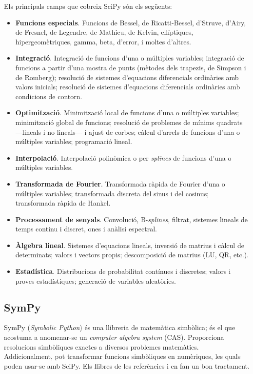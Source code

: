 Els principals camps  que cobreix SciPy són els següents:
\begin{itemize}
	\item \textbf{Funcions especials}. Funcions de Bessel, de Ricatti-Bessel, d'Struve,  d'Airy, de Fresnel, de Legendre, de Mathieu, de Kelvin, eŀlíptiques, hipergeomètriques, gamma, beta, d'error,  i moltes d'altres.
	\item \textbf{Integració}. Integració de funcions d'una o múltiples variables; integració de funcions a partir d'una mostra de punts (mètodes dels trapezis, de Simpson i de Romberg); resolució de sistemes d'equacions diferencials ordinàries amb valors inicials; resolució de sistemes d'equacions diferencials ordinàries amb condicions de contorn.
	\item \textbf{Optimització}. Minimització local de funcions d'una o múltiples variables; minimització global de funcions; resolució de problemes de mínims quadrats ---lineals i no lineals--- i ajust de corbes; càlcul d'arrels de funcions d'una o múltiples variables;  programació lineal.
	\item \textbf{Interpolació}. Interpolació polinòmica o per \textit{splines} de funcions d'una o múltiples variables.
	\item \textbf{Transformada de Fourier}. Transformada ràpida de Fourier d'una o múltiples variables; transformada discreta del sinus i del cosinus; transformada ràpida de Hankel.
	\item \textbf{Processament de senyals}. Convolució, B-\textit{splines}, filtrat, sistemes lineals de temps continu i discret, ones i anàlisi espectral.
	\item \textbf{Àlgebra lineal}. Sistemes d'equacions lineals, inversió de matrius i càlcul de determinats; valors i vectors propis; descomposició de matrius (LU, QR, etc.).
	\item \textbf{Estadística}. Distribucions de probabilitat contínues i discretes; valors i proves estadístiques; generació de variables aleatòries.
\end{itemize}


\subsection{SymPy}

SymPy (\textit{Symbolic Python}) és una llibreria de matemàtica simbòlica; és el que acostuma a anomenar-se un \textit{computer algebra system} (CAS). Proporciona resolucions simbòliques exactes a diversos problemes matemàtics. Addicionalment, pot transformar funcions simbòliques en numèriques, les quals poden usar-se amb SciPy. Els llibres de les referències \cite{JOH} i \cite{HIL} en fan un bon tractament.

